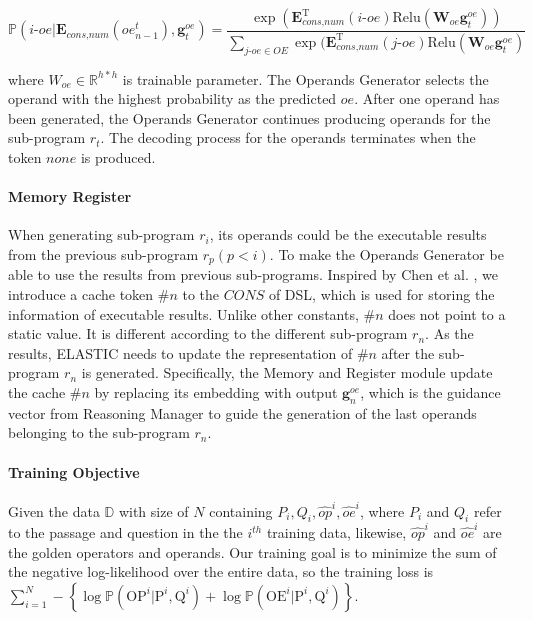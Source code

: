 \documentclass{article}
\begin{document}
\begin{equation}\label{eq:opout}
	\mathbb{P} (i\text{-}oe | \mathbf{E}_{\textit{cons}, \textit{num}}(oe^{t}_{n-1}), \mathbf{g}^{oe}_{t})  
    	= \frac {\exp (\mathbf{E}^\mathrm{T}_{\textit{cons},\textit{num}}(i\text{-}oe)  \text{Relu} (\mathbf{W}_{oe} \mathbf{g}^{oe}_{t}) ) } 
        		{\sum_{j\text{-}oe \in \textit{OE}} \exp (\mathbf{E}^\mathrm{T}_{\textit{cons},\textit{num}}(j\text{-}oe) \text{Relu} (\mathbf{W}_{oe} \mathbf{g}^{oe}_{t} ) }
\end{equation}

where \(W_{oe} \in \mathbb{R}^{h*h}\) is trainable parameter. The Operands Generator selects the operand with the highest probability as the predicted \(oe\). After one operand has been generated, the Operands Generator continues producing operands for the sub-program \(r_{t}\). The decoding process for the operands terminates when the token \(\textit{none}\) is produced.

\paragraph{Memory Register}
\label{section: memory_register}

When generating sub-program \(r_{i}\), its operands could be the executable results from the previous sub-program \(r_{p} (p < i)\). To make the Operands Generator be able to use the results from previous sub-programs. Inspired by Chen et al. \cite{finqa}, we introduce a cache token \(\#n\) to the \(\textit{CONS}\) of DSL, which is used for storing the information of executable results. Unlike other constants, \(\#n\) does not point to a static value. It is different according to the different sub-program \(r_{n}\). As the results, ELASTIC needs to update the representation of \(\#n\) after the sub-program \(r_{n}\) is generated. Specifically, the Memory and Register module update the cache \(\#n\) by replacing its embedding with output \(\mathbf{g}^{oe}_{n}\), which is the guidance vector from Reasoning Manager to guide the generation of the last operands belonging to the sub-program \(r_{n}\).



\paragraph{Training Objective}
Given the data \(\mathbb{D}\) with size of \(N\) containing \(P_{i}, Q_{i}, \hat{op}^{i}, \hat{oe}^{i}\), where \(P_{i}\) and \(Q_{i}\) refer to the passage and question in the the \(i^{th}\) training data, likewise, \(\hat{op}^{i}\) and \(\hat{oe}^{i}\) are the golden operators and operands. Our training goal is to minimize the sum of the negative log-likelihood over the entire data, so the training loss is \(\sum^{N}_{i=1} - \left \{ \log \mathbb{P}(\text{OP}^{i} | \text{P}^{i}, \text{Q}^{i}) + \log \mathbb{P}(\text{OE}^{i} | \text{P}^{i}, \text{Q}^{i})  \right \}.
\)
\end{document}
